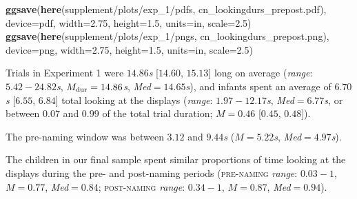 \documentclass[
  doc,floatsintext]{apa6}
\newenvironment{Shaded}{\begin{snugshade}}{\end{snugshade}}
\newcommand{\AttributeTok}[1]{\textcolor[rgb]{0.13,0.29,0.53}{#1}}
\newcommand{\FloatTok}[1]{\textcolor[rgb]{0.00,0.00,0.81}{#1}}
\newcommand{\FunctionTok}[1]{\textcolor[rgb]{0.13,0.29,0.53}{\textbf{#1}}}
\newcommand{\NormalTok}[1]{#1}
\newcommand{\StringTok}[1]{\textcolor[rgb]{0.31,0.60,0.02}{#1}}
\begin{document}
\begin{Shaded}
\begin{Highlighting}[]
\FunctionTok{ggsave}\NormalTok{(}\FunctionTok{here}\NormalTok{(}\StringTok{\textquotesingle{}supplement/plots/exp\_1/pdfs\textquotesingle{}}\NormalTok{, }\StringTok{\textquotesingle{}cn\_lookingdurs\_prepost.pdf\textquotesingle{}}\NormalTok{), }
       \AttributeTok{device=}\StringTok{\textquotesingle{}pdf\textquotesingle{}}\NormalTok{, }\AttributeTok{width=}\FloatTok{2.75}\NormalTok{, }\AttributeTok{height=}\FloatTok{1.5}\NormalTok{, }\AttributeTok{units=}\StringTok{\textquotesingle{}in\textquotesingle{}}\NormalTok{, }\AttributeTok{scale=}\FloatTok{2.5}\NormalTok{)}
\FunctionTok{ggsave}\NormalTok{(}\FunctionTok{here}\NormalTok{(}\StringTok{\textquotesingle{}supplement/plots/exp\_1/pngs\textquotesingle{}}\NormalTok{, }\StringTok{\textquotesingle{}cn\_lookingdurs\_prepost.png\textquotesingle{}}\NormalTok{), }
       \AttributeTok{device=}\StringTok{\textquotesingle{}png\textquotesingle{}}\NormalTok{, }\AttributeTok{width=}\FloatTok{2.75}\NormalTok{, }\AttributeTok{height=}\FloatTok{1.5}\NormalTok{, }\AttributeTok{units=}\StringTok{\textquotesingle{}in\textquotesingle{}}\NormalTok{, }\AttributeTok{scale=}\FloatTok{2.5}\NormalTok{)}
\end{Highlighting}
\end{Shaded}

Trials in Experiment 1 were \(14.86\)\textit{s} {[}\(14.60\), \(15.13\){]} long on average (\textit{range}: \(5.42-24.82\)\textit{s}, \(M_\textnormal{dur}=14.86\)\textit{s}, \textit{Med}\(=14.65\)\textit{s}), and infants spent an average of \(6.70\)\textit{s} {[}\(6.55\), \(6.84\){]} total looking at the displays (\textit{range}: \(1.97-12.17\)\textit{s}, \textit{Med}\(=6.77\)\textit{s}, or between \(0.07\) and \(0.99\) of the total trial duration; \(M=0.46\) {[}\(0.45\), \(0.48\){]}).

The pre-naming window was between \(3.12\) and \(9.44\)\textit{s} (\(M=5.22\)\textit{s}, \textit{Med}\(=4.97\)\textit{s}).

The children in our final sample spent similar proportions of time looking at the displays during the pre- and post-naming periods (\textsc{pre-naming} \textit{range}: \(0.03-1\), \(M=0.77\), \textit{Med}\(=0.84\); \textsc{post-naming} \textit{range}: \(0.34-1\), \(M=0.87\), \textit{Med}\(=0.94\)).
\end{document}
